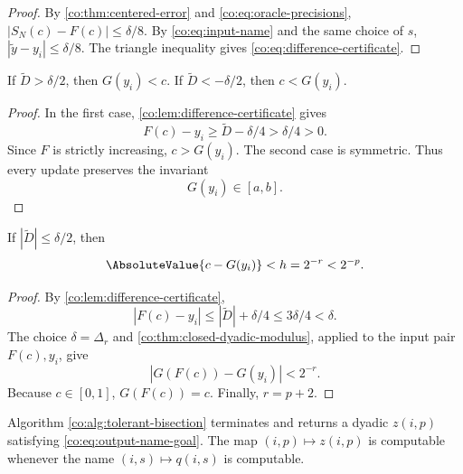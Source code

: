 \begin{proof}
By \cref{co:thm:centered-error} and \eqref{co:eq:oracle-precisions},
$|S_N(c)-F(c)|\le\delta/8$.  By \eqref{co:eq:input-name} and the same choice of
$s$, $|\widetilde y-y_i|\le\delta/8$.  The triangle inequality gives
\eqref{co:eq:difference-certificate}.
\end{proof}

\begin{lemma}\label{co:lem:safe-updates}
If $\widetilde D>\delta/2$, then $G(y_i)<c$.  If
$\widetilde D<-\delta/2$, then $c<G(y_i)$.
\end{lemma}

\begin{proof}
In the first case, \cref{co:lem:difference-certificate} gives
\[
 F(c)-y_i\ge\widetilde D-\delta/4>\delta/4>0.
\]
Since $F$ is strictly increasing, $c>G(y_i)$.  The second case is symmetric.
Thus every update preserves the invariant
\begin{equation}\label{co:eq:bracket-invariant}
 G(y_i)\in[a,b].
\end{equation}
\end{proof}

\begin{lemma}\label{co:lem:near-branch}
If $|\widetilde D|\le\delta/2$, then
\begin{equation}\label{co:eq:near-output}
 \AbsoluteValue{c-G(y_i)}<h=2^{-r}<2^{-p}.
\end{equation}
\end{lemma}

\begin{proof}
By \cref{co:lem:difference-certificate},
\[
 |F(c)-y_i|\le|\widetilde D|+\delta/4
 \le3\delta/4<\delta.
\]
The choice $\delta=\Delta_r$ and \cref{co:thm:closed-dyadic-modulus}, applied to
the input pair $F(c),y_i$, give
\[
 |G(F(c))-G(y_i)|<2^{-r}.
\]
Because $c\in[0,1]$, $G(F(c))=c$.  Finally, $r=p+2$.
\end{proof}

\begin{theorem}
\label{co:thm:bisection-correct}
Algorithm \ref{co:alg:tolerant-bisection} terminates and returns a dyadic
$z(i,p)$ satisfying \eqref{co:eq:output-name-goal}.  The map $(i,p)\mapsto z(i,p)$
is computable whenever the name $(i,s)\mapsto q(i,s)$ is computable.
\end{theorem}

